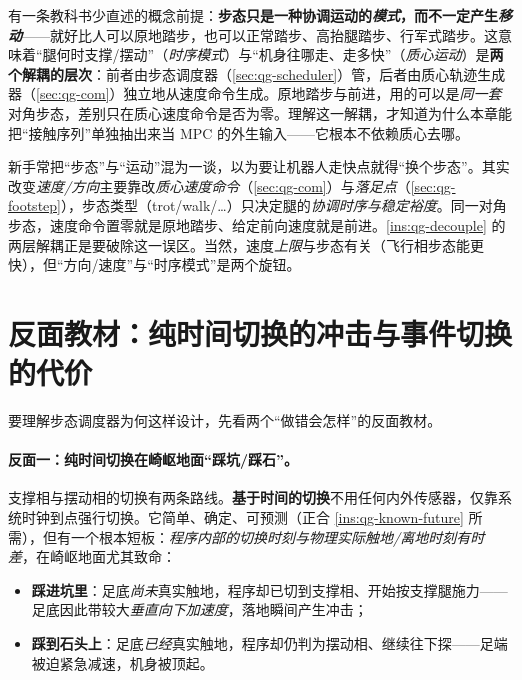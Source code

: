 \begin{insight}\label{ins:qg-decouple}
有一条教科书少直述的概念前提：\textbf{步态只是一种协调运动的\emph{模式}，而不一定产生\emph{移动}}——就好比人可以原地踏步，也可以正常踏步、高抬腿踏步、行军式踏步\cite{unitree2023quadruped}。这意味着“腿何时支撑/摆动”（\emph{时序模式}）与“机身往哪走、走多快”（\emph{质心运动}）是\textbf{两个解耦的层次}：前者由步态调度器（\cref{sec:qg-scheduler}）管，后者由质心轨迹生成器（\cref{sec:qg-com}）独立地从速度命令生成。原地踏步与前进，用的可以是\emph{同一套}对角步态，差别只在质心速度命令是否为零。理解这一解耦，才知道为什么本章能把“接触序列”单独抽出来当 MPC 的外生输入——它根本不依赖质心去哪。
\end{insight}

\begin{pitfall}
新手常把“步态”与“运动”混为一谈，以为要让机器人走快点就得“换个步态”。其实改变\emph{速度/方向}主要靠改\emph{质心速度命令}（\cref{sec:qg-com}）与\emph{落足点}（\cref{sec:qg-footstep}），步态类型（trot/walk/\dots）只决定腿的\emph{协调时序与稳定裕度}。同一对角步态，速度命令置零就是原地踏步、给定前向速度就是前进。\cref{ins:qg-decouple} 的两层解耦正是要破除这一误区。当然，速度\emph{上限}与步态有关（飞行相步态能更快），但“方向/速度”与“时序模式”是两个旋钮。
\end{pitfall}

\section{反面教材：纯时间切换的冲击与事件切换的代价}
\label{sec:qg-reverse}

要理解步态调度器为何这样设计，先看两个“做错会怎样”的反面教材。

\paragraph{反面一：纯时间切换在崎岖地面“踩坑/踩石”。}
支撑相与摆动相的切换有两条路线。\textbf{基于时间的切换}不用任何内外传感器，仅靠系统时钟到点强行切换\cite{yu2021quadruped}。它简单、确定、可预测（正合 \cref{ins:qg-known-future} 所需），但有一个根本短板：\emph{程序内部的切换时刻与物理实际触地/离地时刻有时差}，在崎岖地面尤其致命：
\begin{itemize}
  \item \textbf{踩进坑里}：足底\emph{尚未}真实触地，程序却已切到支撑相、开始按支撑腿施力——足底因此带较大\emph{垂直向下加速度}，落地瞬间产生冲击；
  \item \textbf{踩到石头上}：足底\emph{已经}真实触地，程序却仍判为摆动相、继续往下探——足端被迫紧急减速，机身被顶起。
\end{itemize}

